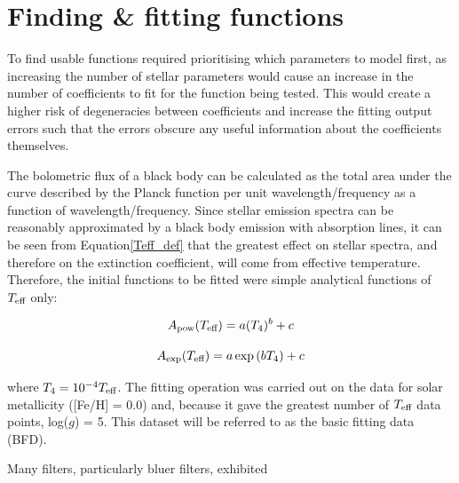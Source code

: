 \documentclass[12pt, a4paper]{report}
\begin{document}
\section{Finding \& fitting functions} \label{find_fit}
To find usable functions required prioritising which parameters to model first, as increasing the number of stellar parameters would cause an increase in the number of coefficients to fit for the function being tested. This would create a higher risk of degeneracies between coefficients and increase the fitting output errors such that the errors obscure any useful information about the coefficients themselves.

The bolometric flux of a black body can be calculated as the total area under the curve described by the Planck function per unit wavelength/frequency as a function of wavelength/frequency. Since stellar emission spectra can be reasonably approximated by a black body emission with absorption lines, it can be seen from Equation\ref{Teff_def} that the greatest effect on stellar spectra, and therefore on the extinction coefficient, will come from effective temperature. Therefore, the initial functions to be fitted were simple analytical functions of $T_{\textnormal{eff}}$ only:

\begin{equation}
A_{\textnormal{pow}} (T_{\textnormal{eff}}) = a (T_{4})^{b} + c
\label{Teff_pow}
\end{equation}

\begin{equation}
A_{\textnormal{exp}} (T_{\textnormal{eff}}) = a \exp{(b T_{4})} + c
\label{Teff_exp}
\end{equation}

where $T_{4} = 10^{-4}T_{\textnormal{eff}}$. The fitting operation was carried out on the data for solar metallicity ([Fe/H] = 0.0) and, because it gave the greatest number of $T_{\textnormal{eff}}$ data points, log($g$) = 5. This dataset will be referred to as the basic fitting data (BFD).

Many filters, particularly bluer filters, exhibited
\end{document}
